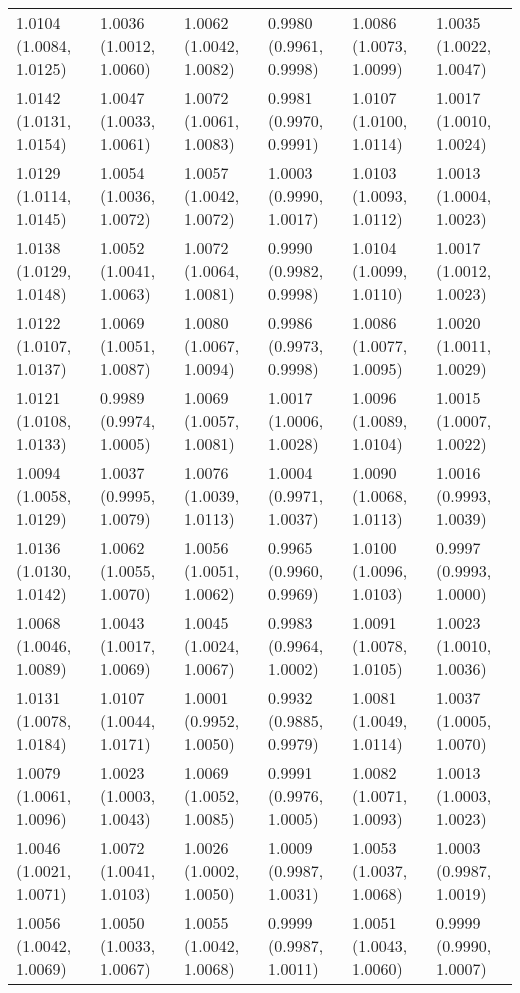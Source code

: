 \begin{table}[ht]
\begin{tabular}{llllll}
  1.0104 (1.0084, 1.0125) & 1.0036 (1.0012, 1.0060) & 1.0062 (1.0042, 1.0082) & 0.9980 (0.9961, 0.9998) & 1.0086 (1.0073, 1.0099) & 1.0035 (1.0022, 1.0047) \\ 
  1.0142 (1.0131, 1.0154) & 1.0047 (1.0033, 1.0061) & 1.0072 (1.0061, 1.0083) & 0.9981 (0.9970, 0.9991) & 1.0107 (1.0100, 1.0114) & 1.0017 (1.0010, 1.0024) \\ 
  1.0129 (1.0114, 1.0145) & 1.0054 (1.0036, 1.0072) & 1.0057 (1.0042, 1.0072) & 1.0003 (0.9990, 1.0017) & 1.0103 (1.0093, 1.0112) & 1.0013 (1.0004, 1.0023) \\ 
  1.0138 (1.0129, 1.0148) & 1.0052 (1.0041, 1.0063) & 1.0072 (1.0064, 1.0081) & 0.9990 (0.9982, 0.9998) & 1.0104 (1.0099, 1.0110) & 1.0017 (1.0012, 1.0023) \\ 
  1.0122 (1.0107, 1.0137) & 1.0069 (1.0051, 1.0087) & 1.0080 (1.0067, 1.0094) & 0.9986 (0.9973, 0.9998) & 1.0086 (1.0077, 1.0095) & 1.0020 (1.0011, 1.0029) \\ 
  1.0121 (1.0108, 1.0133) & 0.9989 (0.9974, 1.0005) & 1.0069 (1.0057, 1.0081) & 1.0017 (1.0006, 1.0028) & 1.0096 (1.0089, 1.0104) & 1.0015 (1.0007, 1.0022) \\ 
  1.0094 (1.0058, 1.0129) & 1.0037 (0.9995, 1.0079) & 1.0076 (1.0039, 1.0113) & 1.0004 (0.9971, 1.0037) & 1.0090 (1.0068, 1.0113) & 1.0016 (0.9993, 1.0039) \\ 
  1.0136 (1.0130, 1.0142) & 1.0062 (1.0055, 1.0070) & 1.0056 (1.0051, 1.0062) & 0.9965 (0.9960, 0.9969) & 1.0100 (1.0096, 1.0103) & 0.9997 (0.9993, 1.0000) \\ 
  1.0068 (1.0046, 1.0089) & 1.0043 (1.0017, 1.0069) & 1.0045 (1.0024, 1.0067) & 0.9983 (0.9964, 1.0002) & 1.0091 (1.0078, 1.0105) & 1.0023 (1.0010, 1.0036) \\ 
  1.0131 (1.0078, 1.0184) & 1.0107 (1.0044, 1.0171) & 1.0001 (0.9952, 1.0050) & 0.9932 (0.9885, 0.9979) & 1.0081 (1.0049, 1.0114) & 1.0037 (1.0005, 1.0070) \\ 
  1.0079 (1.0061, 1.0096) & 1.0023 (1.0003, 1.0043) & 1.0069 (1.0052, 1.0085) & 0.9991 (0.9976, 1.0005) & 1.0082 (1.0071, 1.0093) & 1.0013 (1.0003, 1.0023) \\ 
  1.0046 (1.0021, 1.0071) & 1.0072 (1.0041, 1.0103) & 1.0026 (1.0002, 1.0050) & 1.0009 (0.9987, 1.0031) & 1.0053 (1.0037, 1.0068) & 1.0003 (0.9987, 1.0019) \\ 
  1.0056 (1.0042, 1.0069) & 1.0050 (1.0033, 1.0067) & 1.0055 (1.0042, 1.0068) & 0.9999 (0.9987, 1.0011) & 1.0051 (1.0043, 1.0060) & 0.9999 (0.9990, 1.0007) \\ 

\end{tabular}
\end{table}
